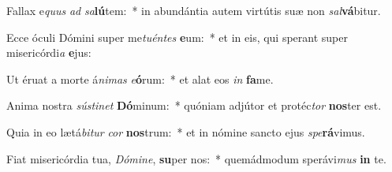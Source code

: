 \item Fallax e\textit{quus} \textit{ad} \textit{sa}\textbf{lú}tem:~* in abundántia autem virtútis suæ non \textit{sal}\textbf{vá}bitur.
\item Ecce óculi Dómini super me\textit{tu}\textit{én}\textit{tes} \textbf{e}um:~* et in eis, qui sperant super misericórdi\textit{a} \textbf{e}jus:
\item Ut éruat a morte á\textit{ni}\textit{mas} \textit{e}\textbf{ó}rum:~* et alat eos \textit{in} \textbf{fa}me.
\item Anima nostra \textit{sús}\textit{ti}\textit{net} \textbf{Dó}minum:~* quóniam adjútor et protéc\textit{tor} \textbf{nos}ter est.
\item Quia in eo lætá\textit{bi}\textit{tur} \textit{cor} \textbf{nos}trum:~* et in nómine sancto ejus \textit{spe}\textbf{rá}vimus.
\item Fiat misericórdia tua, \textit{Dó}\textit{mi}\textit{ne}, \textbf{su}per nos:~* quemádmodum sperávi\textit{mus} \textbf{in} te.
